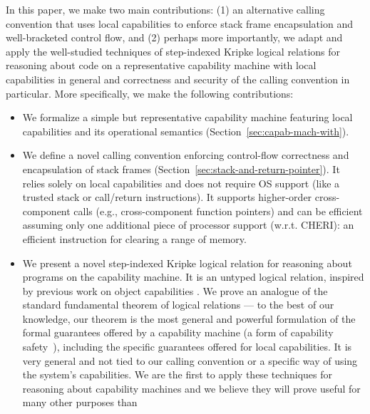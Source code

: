 \documentclass[format=acmsmall, review=true, screen=true]{acmart}
\renewcommand{\sectionname}{Section}
\newcommand\dominique[1]{{\color{purple} \sf \footnotesize {DD: #1}}\\}
\renewcommand\dominique[1]{}
\begin{document}
\dominique{I think we should include a comparison with the conference paper, and explain what the delta is for this journal version.}
In this paper, we make two main contributions: (1) an alternative calling
convention that uses local capabilities to enforce stack frame encapsulation and
well-bracketed control flow, and (2) perhaps more importantly, we adapt and
apply the well-studied techniques of step-indexed Kripke logical relations for
reasoning about code on a representative capability machine with local
capabilities in general and correctness and security of the calling convention
in particular. More specifically, we make the following contributions:
\begin{itemize}
\item We formalize a simple but representative capability machine featuring local
  capabilities and its operational semantics
  (\sectionname~\ref{sec:capab-mach-with}).
\item We define a novel calling convention enforcing control-flow correctness and
  encapsulation of stack frames (\sectionname~\ref{sec:stack-and-return-pointer}). It
  relies solely on local capabilities and does not require OS support (like a
  trusted stack or call/return instructions).
  It supports higher-order cross-component calls (e.g., cross-component function
  pointers) and can be efficient assuming only one additional piece of processor
  support (w.r.t. CHERI): an efficient instruction for clearing a range of memory.
\item We present a novel step-indexed Kripke logical relation for reasoning
  about programs on the capability machine. It is an untyped logical relation,
  inspired by previous work on object capabilities \citep{Devriese:2016ObjCap}.
  We prove an analogue of the standard fundamental theorem of logical relations
  --- to the best of our knowledge, our theorem is %
  the most general and powerful formulation of the formal guarantees offered by
  a capability machine (a form of capability
  safety~\citep{Devriese:2016ObjCap,Maffeis2010OC}), including the specific
  guarantees offered for local capabilities. It is very general and not tied to
  our calling convention or a specific way of using the system's capabilities.
  We are the first to apply these techniques for reasoning about capability
  machines and we believe they will prove useful for many other purposes than

\end{itemize}
\end{document}
